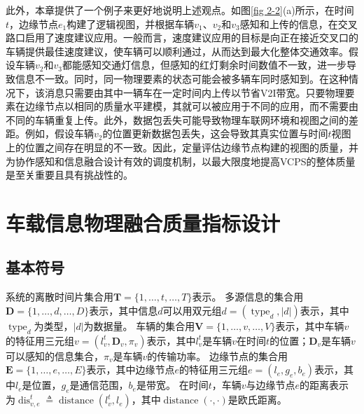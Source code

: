此外，本章提供了一个例子来更好地说明上述观点。如图\ref{fig 2-2}(a)所示，在时间 $t$，边缘节点$e_1$构建了逻辑视图，并根据车辆$v_1$、$v_2$和$v_3$感知和上传的信息，在交叉路口启用了速度建议应用。一般而言，速度建议应用的目标是向正在接近交叉口的车辆提供最佳速度建议，使车辆可以顺利通过，从而达到最大化整体交通效率。假设车辆$v_2$和$v_3$都能感知交通灯信息，但感知的红灯剩余时间数值不一致，进一步导致信息不一致。同时，同一物理要素的状态可能会被多辆车同时感知到。在这种情况下，该消息只需要由其中一辆车在一定时间内上传以节省V2I带宽。只要物理要素在边缘节点以相同的质量水平建模，其就可以被应用于不同的应用，而不需要由不同的车辆重复上传。此外，数据包丢失可能导致物理车联网环境和视图之间的差距。例如，假设车辆$v_2$的位置更新数据包丢失，这会导致其真实位置与时间$t$视图上的位置之间存在明显的不一致。因此，定量评估边缘节点构建的视图的质量，并为协作感知和信息融合设计有效的调度机制，以最大限度地提高VCPS的整体质量是至关重要且具有挑战性的。

\section{车载信息物理融合质量指标设计}\label{section 2-4}

\subsection{基本符号}

系统的离散时间片集合用$\mathbf{T}=\{1, \ldots, t, \ldots, T\}$表示。
多源信息的集合用$\mathbf{D}=\{1, \ldots, d, \ldots, D\}$表示，其中信息$d$可以用双元组$d=\left(\operatorname{type}_d, \left|d\right| \right)$表示，其中$\operatorname{type}_d$为类型，$\left|d\right|$为数据量。
车辆的集合用$\mathbf{V}=\{1, \ldots, v, \ldots, V\}$表示，其中车辆$v$的特征用三元组$v=\left (l_v^t, \mathbf{D}_v, \pi_v \right )$表示，其中$l_v^t$是车辆$v$在时间$t$的位置；$\mathbf{D}_v$是车辆$v$可以感知的信息集合，$\pi_v$是车辆$v$的传输功率。
边缘节点的集合用$\mathbf{E}=\{1, \ldots, e, \ldots, E\}$表示，其中边缘节点$e$的特征用三元组$e=\left (l_e, g_e, b_e \right)$表示，其中$l_e$是位置，$g_e$是通信范围，$b_e$是带宽。
在时间$t$，车辆$v$与边缘节点$e$的距离表示为$\operatorname{dis}_{v,e}^t \triangleq \operatorname{distance} \left (l_v^t, l_e \right )$，其中$\operatorname{distance}\left(\cdot,\cdot\right)$是欧氏距离。

